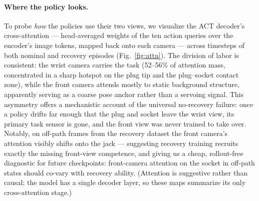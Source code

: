 \paragraph{Where the policy looks.}
To probe \emph{how} the policies use their two views, we visualize the ACT decoder's
cross-attention --- head-averaged weights of the ten action queries over the encoder's
image tokens, mapped back onto each camera --- across timesteps of both nominal and
recovery episodes (Fig.~\ref{fig:attn}). The division of labor is consistent: the
wrist camera carries the task (52--56\% of attention mass, concentrated in a sharp
hotspot on the plug tip and the plug--socket contact zone), while the front camera
attends mostly to static background structure, apparently serving as a coarse pose
anchor rather than a servoing signal. This asymmetry offers a mechanistic account of
the universal no-recovery failure: once a policy drifts far enough that the plug and
socket leave the wrist view, its primary task sensor is gone, and the front view was
never trained to take over. Notably, on off-path frames from the recovery dataset the
front camera's attention visibly shifts onto the jack --- suggesting recovery training
recruits exactly the missing front-view competence, and giving us a cheap,
rollout-free diagnostic for future checkpoints: front-camera attention on the socket
in off-path states should co-vary with recovery ability. (Attention is suggestive
rather than causal; the model has a single decoder layer, so these maps summarize its
only cross-attention stage.)
